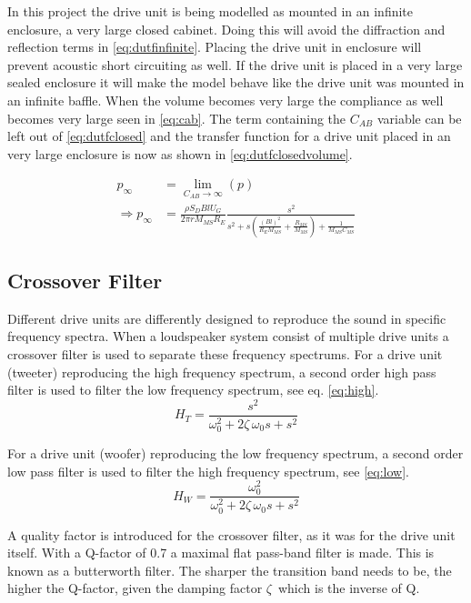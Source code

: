 In this project the drive unit is being modelled as mounted in an infinite enclosure, a very large closed cabinet. Doing this will avoid the diffraction and reflection terms in \cref{eq:dutfinfinite}.
Placing the drive unit in enclosure will prevent acoustic short circuiting as well.   
If the drive unit is placed in a very large sealed enclosure it will make the model behave like the drive unit was mounted in an infinite baffle.  
When the volume becomes very large the compliance as well becomes very large seen in \cref{eq:cab}. 
The term containing the $C_{AB}$ variable can be left out of \cref{eq:dutfclosed} and the transfer function for a drive unit placed in an very large enclosure is now as shown in \cref{eq:dutfclosedvolume}.

\begin{align}
	p_\infty &= \lim_{C_{AB}\rightarrow\infty}\left(p\right) \\
	\Rightarrow p_\infty &= \frac{\rho S_D B l U_G}{2\pi r M_{MS} R_E}\frac{s^2}{s^2 +s \left(\frac{(Bl)^2}{R_EM_{MS}}+\frac{R_{MS}}{M_{MS}}\right)+\frac{1}{M_{MS}C_{MS}}}
	\label{eq:dutfclosedvolume}
\end{align}

\subsection{Crossover Filter}
Different drive units are differently designed to reproduce the sound in specific frequency spectra.
When a loudspeaker system consist of multiple drive units a crossover filter is used to separate these frequency spectrums.
For a drive unit (tweeter) reproducing the high frequency spectrum, a second order high pass filter is used to filter the low frequency spectrum, see eq. \ref{eq:high}. \cite[p.~82-83]{Elektroakustik}
\begin{equation}
H_{T} = \frac{s^2}{\omega_0^2+2\zeta\,\omega_0 s+s^2}
\label{eq:high}
\end{equation}

\newpage For a drive unit (woofer) reproducing the low frequency spectrum, a second order low pass filter is used to filter the high frequency spectrum, see \cref{eq:low}.
\begin{equation}
H_{W} = \frac{\omega_0^2}{\omega_0^2+2\zeta\,\omega_0 s+s^2}
\label{eq:low}
\end{equation}

A quality factor is introduced for the crossover filter, as it was for the drive unit itself. 
With a Q-factor of 0.7 a maximal flat pass-band filter is made.
This is known as a butterworth filter. 
The sharper the transition band needs to be, the higher the Q-factor, given the damping factor $\zeta\,$ which is the inverse of Q. 

